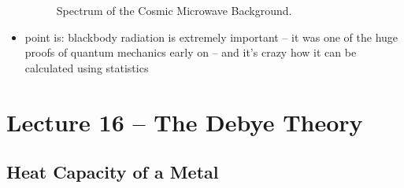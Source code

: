 \documentclass[10pt]{article}
\begin{document}
\begin{itemize}
\begin{figure}[h]
            \caption{Spectrum of the Cosmic Microwave Background.}
            \label{fig:cosmicMicroBackground}
        \end{figure}
    \item point is: blackbody radiation is extremely important -- it was one of the huge proofs of quantum mechanics early on -- and it's crazy how it can be calculated using statistics
\end{itemize}




\section{Lecture 16 -- The Debye Theory}
\subsection{Heat Capacity of a Metal}
\end{document}
